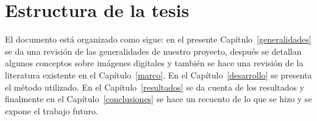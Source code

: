 
\section{Estructura de la tesis}

El documento está organizado como sigue: en el presente
Capítulo~\ref{generalidades} se da una revisión de las generalidades de nuestro
proyecto, después se detallan algunos conceptos sobre imágenes digitales y
también se hace una revisión de la literatura existente en el
Capítulo~\ref{marco}. En el Capítulo~\ref{desarrollo} se presenta el método
utilizado. En el Capítulo~\ref{resultados} se da cuenta de los resultados y
finalmente en el Capítulo~\ref{conclusiones} se hace un recuento de lo que se
hizo y se expone el trabajo futuro.
